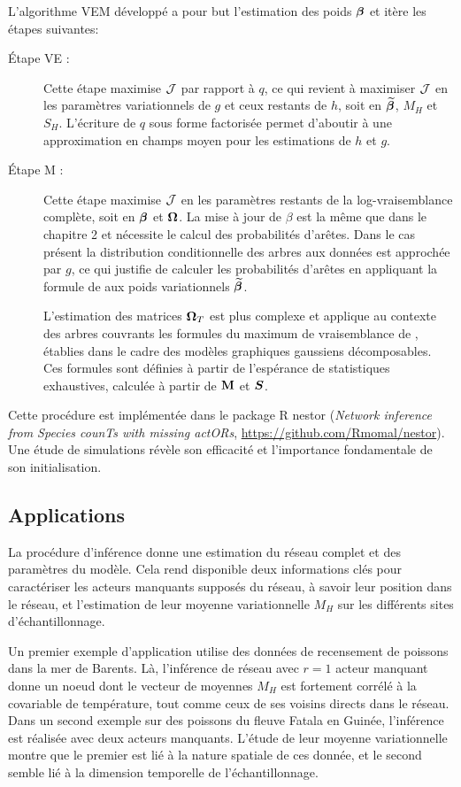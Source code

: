 L'algorithme VEM développé a pour but l'estimation des poids ${\boldsymbol{\beta}}$ et itère les étapes suivantes:
\begin{description}
\item[Étape VE :] Cette étape maximise ${\mathcal{J}}$ par rapport à $q$, ce qui revient à maximiser ${\mathcal{J}}$ en les paramètres variationnels de $g$ et ceux restants de $h$, soit en $\widetilde{{\boldsymbol{\beta}}}$, $M_H$ et $S_H$. L'écriture de $q$ sous forme factorisée  permet d'aboutir à une approximation en champs moyen pour les estimations de $h$ et $g$. 
\item[Étape M :] Cette étape maximise ${\mathcal{J}}$ en les paramètres restants de la log-vraisemblance complète, soit en ${\boldsymbol{\beta}}$ et ${\boldsymbol{\Omega}}$. La mise à jour de $\beta$ est la même que dans le chapitre 2 et nécessite le calcul des probabilités d'arêtes. Dans le cas présent la distribution conditionnelle des arbres aux données est approchée par $g$, ce qui justifie de calculer les probabilités d'arêtes en appliquant la formule de \citet{kirshner} aux poids variationnels $\widetilde{{\boldsymbol{\beta}}}$. 

L'estimation des matrices ${\boldsymbol{\Omega}}_T$ est plus complexe et applique au contexte des arbres couvrants  les formules du maximum de vraisemblance de \citet{Lau96}, établies dans le cadre des modèles graphiques gaussiens décomposables. Ces formules sont définies à partir de l'espérance de statistiques exhaustives, calculée à partir de ${\bf M}$ et ${\boldsymbol{S}}$.
\end{description}
Cette procédure est implémentée dans le package R nestor (\textit{Network inference from Species counTs with missing actORs}, \url{https://github.com/Rmomal/nestor}). Une étude de simulations révèle son efficacité et l'importance fondamentale de son initialisation.

\subsection*{Applications}
La procédure d'inférence donne une estimation du réseau complet et des paramètres du modèle. Cela rend disponible deux informations clés pour caractériser les acteurs manquants supposés du réseau, à savoir leur position dans le réseau, et l'estimation de leur moyenne variationnelle $M_H$ sur les différents sites d'échantillonnage. 

Un premier exemple d'application utilise des données de recensement de poissons dans la mer de Barents. Là, l'inférence de réseau avec $r=1$ acteur manquant donne un noeud dont le vecteur de moyennes $M_H$ est fortement corrélé à la covariable de température, tout comme ceux de ses voisins directs dans le réseau. Dans un second exemple sur des poissons du fleuve Fatala en Guinée, l'inférence est réalisée avec deux acteurs manquants. L'étude de leur moyenne variationnelle  montre que le premier est lié à la nature spatiale de ces donnée, et le second semble lié à la dimension temporelle de l'échantillonnage.

